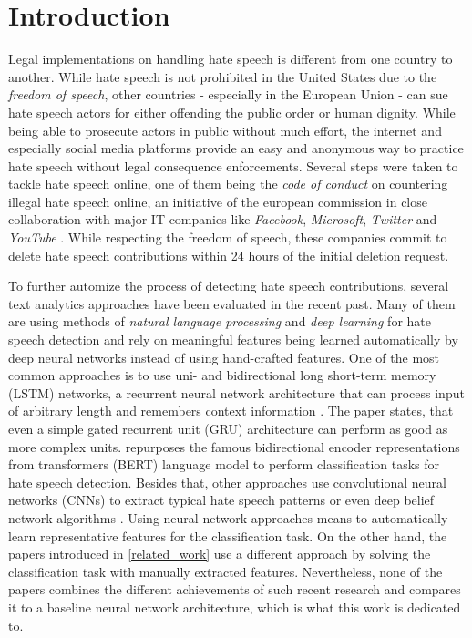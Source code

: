 \section{Introduction}

Legal implementations on handling hate speech is different from one country to another. While hate speech is not prohibited in the United States due to the \textit{freedom of speech}, other countries - especially in the European Union - can sue hate speech actors for either offending the public order or human dignity. While being able to prosecute actors in public without much effort, the internet and especially social media platforms provide an easy and anonymous way to practice hate speech without legal consequence enforcements. Several steps were taken to tackle hate speech online, one of them being the \textit{code of conduct} on countering illegal hate speech online, an initiative of the european commission in close collaboration with major IT companies like \textit{Facebook}, \textit{Microsoft}, \textit{Twitter} and \textit{YouTube} \cite{EuropeanCommission.20200622}. While respecting the freedom of speech, these companies commit to delete hate speech contributions within 24 hours of the initial deletion request. 

To further automize the process of detecting hate speech contributions, several text analytics approaches have been evaluated in the recent past. Many of them are using methods of \textit{natural language processing} and \textit{deep learning} for hate speech detection and rely on meaningful features being learned automatically by deep neural networks instead of using hand-crafted features. One of the most common approaches is to use uni- and bidirectional long short-term memory (LSTM) networks, a recurrent neural network ar\-chi\-tec\-tu\-re that can process input of arbitrary length and remembers context information \cite{Dorris2020, Syam2019, Saksesi2018}. The paper \cite{Founta2019} states, that even a simple gated recurrent unit (GRU) architecture can perform as good as more complex units. \cite{Saleh2020} repurposes the famous bidirectional encoder representations from transformers (BERT) language model to perform clas\-si\-fi\-ca\-tion tasks for hate speech detection. Besides that, other approaches use con\-vo\-lu\-tional neural networks (CNNs) to extract typical hate speech patterns \cite{Badjatiya2017, Roy2020, Kapil2020} or even deep belief network algorithms \cite{Muhammad2020}. Using neural network approaches means to automatically learn representative features for the classification task. On the other hand, the papers introduced in \autoref{related_work} use a different approach by solving the classification task with manually extracted features. Nevertheless, none of the papers combines the different achievements of such recent research and compares it to a baseline neural network architecture, which is what this work is dedicated to.

